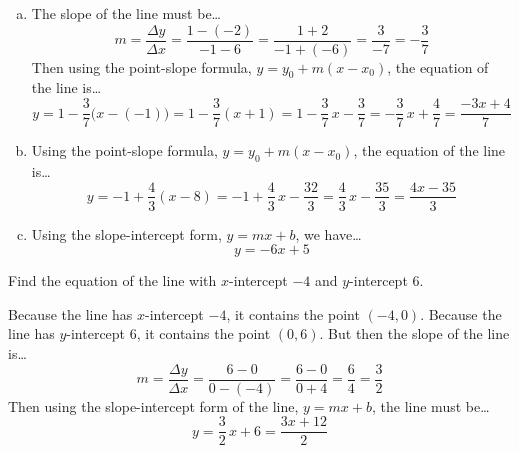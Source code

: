 \documentclass[11pt,letterpaper]{article}
\begin{document}
\sol 
\begin{enumerate}[(a)]
\item The slope of the line must be\dots
	\[
	m= \dfrac{\Delta y}{\Delta x}= \dfrac{1 - (-2)}{-1 - 6}= \dfrac{1 + 2}{-1 + (-6)}= \dfrac{3}{-7}= -\dfrac{3}{7}
	\] 
Then using the point-slope formula, $y= y_0 + m(x - x_0)$, the equation of the line is\dots
	\[
	y= 1 - \dfrac{3}{7} \big(x - (-1) \big)= 1 - \dfrac{3}{7} (x + 1)= 1 - \dfrac{3}{7}\, x - \dfrac{3}{7}= -\dfrac{3}{7}\,x + \dfrac{4}{7}= \dfrac{-3x + 4}{7}
	\] \pspace


\item Using the point-slope formula, $y= y_0 + m(x - x_0)$, the equation of the line is\dots
	\[
	y= -1 + \dfrac{4}{3} \left(x - 8 \right)= -1 + \dfrac{4}{3} \,x - \dfrac{32}{3}= \dfrac{4}{3}\, x - \dfrac{35}{3}= \dfrac{4x - 35}{3}
	\] \pspace

\item Using the slope-intercept form, $y= mx + b$, we have\dots
	\[
	y= -6x + 5
	\]
\end{enumerate}



\newpage



 Find the equation of the line with $x$-intercept $-4$ and $y$-intercept $6$. \pspace

\sol Because the line has $x$-intercept $-4$, it contains the point $(-4, 0)$. Because the line has $y$-intercept $6$, it contains the point $(0, 6)$. But then the slope of the line is\dots
	\[
	m= \dfrac{\Delta y}{\Delta x}= \dfrac{6 - 0}{0 - (-4)}= \dfrac{6 - 0}{0 + 4}= \dfrac{6}{4}= \dfrac{3}{2}
	\]
Then using the slope-intercept form of the line, $y= mx + b$, the line must be\dots
	\[
	y= \dfrac{3}{2}\,x + 6= \dfrac{3x + 12}{2}
	\]
\end{document}
